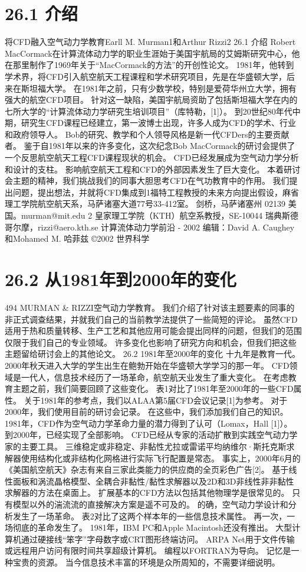 \documentclass[UTF8,11pt,a4paper,openany,fontset=fandol]{ctexbook}
\begin{document}
\section{26.1 介绍}
将CFD融入空气动力学教育Earll M. Murman1和Arthur Rizzi2 26.1 介绍 Robert MacCormack在计算流体动力学的职业生涯始于美国宇航局的艾姆斯研究中心，他在那里制作了1969年关于“MacCormack的方法”的开创性论文。 1981年，他转到学术界，将CFD引入航空航天工程课程和学术研究项目，先是在华盛顿大学，后来在斯坦福大学。 在1981年之前，只有少数学校，特别是爱荷华州立大学，拥有强大的航空CFD项目。 针对这一缺陷，美国宇航局资助了包括斯坦福大学在内的七所大学的“计算流体动力学研究生培训项目”（库特勒，[1]）。 到20世纪80年代中期，研究生CFD课程已经建立，第一波博士出现，许多人成为CFD的学术、行业和政府领导人。 Bob的研究、教学和个人领导风格是新一代CFDers的主要贡献者。 鉴于自1981年以来的许多变化，这次纪念Bob MacCormack的研讨会提供了一个反思航空航天工程CFD课程现状的机会。 CFD已经发展成为空气动力学分析和设计的支柱。 影响航空航天工程和CFD的外部因素发生了巨大变化。 本着研讨会主题的精神，我们挑战我们的同事大胆思考CFD在气功教育中的作用。 我们提出问题，提出想法，并就将CFD集成到1福特工程教授的未来方向提出假设，麻省理工学院航空航天系，马萨诸塞大道77号33-412室。 剑桥，马萨诸塞州 02139 美国。murman@mit.edu 2 皇家理工学院（KTH）航空系教授，SE-10044 瑞典斯德哥尔摩，rizzi@aero.kth.se 计算流体动力学前沿 - 2002 编辑：David A. Caughey和Mohamed M. 哈菲兹 ©2002 世界科学

\section{26.2 从1981年到2000年的变化}
494 MURMAN \& RIZZI空气动力学教育。 我们介绍了针对该主题要素的同事的非正式调查结果，并就我们自己的当前教学法提供了一些简短的评论。 虽然CFD适用于热和质量转移、生产工艺和其他应用可能会提出同样的问题，但我们的范围仅限于我们自己的专业领域。 许多变化也影响了研究方向和机会，但我们把这些主题留给研讨会上的其他论文。 26.2 1981年至2000年的变化 十九年是教育一代。 2000年秋天进入大学的学生出生在鲍勃开始在华盛顿大学学习的那一年。 CFD领域是一代人，信息技术经历了一场革命，航空航天业发生了重大变化。 在考虑教育主题之前，我们简要回顾了这些变化。 表1对比了1981年至2000年的一些CFD属性。 关于1981年的参考点，我们以ALAA第5届CFD会议记录[1]为参考。 对于2000年，我们使用目前的研讨会记录。 在这些中，我们添加我们自己的知识。 1981年，CFD作为空气动力学革命力量的潜力得到了认可（Lomax，Hall [1]）。 到2000年，已经实现了全部影响。 CFD已经从专家的活动扩散到实践空气动力学家的主要工具。 三维稳定或非稳定、非黏性尤拉或雷诺平均纳维尔·斯托克斯求解器使用结构化或非结构化网格进行实际飞行配置是常态。 事实上，2000年6月的《美国航空航天》杂志有来自三家此类能力的供应商的全页彩色广告[2]。 基于线性面板和涡流晶格模型、全耦合非黏性/黏性求解器以及2D和3D非线性非非黏性求解器的方法在桌面上。 扩展基本的CFD方法以包括其他物理学是很常见的。 只有模型以外的湍流流的直接解决方案是遥不可及的。 的确，空气动力学设计和分析发生了一场革命。 表2对比了这两个样本年的一些信息技术属性。 再一次，一场彻底的革命发生了。 1981年，IBM PC和Apple Macintosh还没有推出。 大型计算机通过硬接线“笨字”字母数字或CRT图形终端访问。 ARPA Net用于文件传输或远程用户访问有限时间共享超级计算机。 编程以FORTRAN为导向。 记忆是一种宝贵的资源。 当今信息技术丰富的环境是众所周知的，不需要详细说明。
\end{document}
